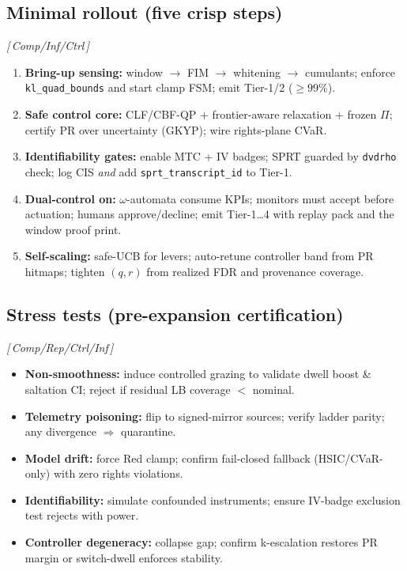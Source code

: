 \documentclass[10pt]{article}
\newcommand{\layertag}[1]{\textsf{\footnotesize[\,#1\,]}}
\begin{document}
\subsection*{Minimal rollout (five crisp steps)}\label{subsec:ops-rollout}
\emph{\layertag{Comp/Inf/Ctrl}}
\begin{enumerate}[leftmargin=*]
\item \textbf{Bring-up sensing:} window $\to$ FIM $\to$ whitening $\to$ cumulants; enforce \texttt{kl\_quad\_bounds} and start clamp FSM; emit Tier-1/2 ($\ge99\%$).
\item \textbf{Safe control core:} CLF/CBF-QP + frontier-aware relaxation + frozen $\Pi$; certify PR over uncertainty (GKYP); wire rights-plane CVaR.
\item \textbf{Identifiability gates:} enable MTC + IV badges; SPRT guarded by \texttt{dvdrho} check; log CIS \emph{and} add \texttt{sprt\_transcript\_id} to Tier-1.
\item \textbf{Dual-control on:} $\omega$-automata consume KPIs; monitors must accept before actuation; humans approve/decline; emit Tier-1…4 with replay pack and the window proof print.
\item \textbf{Self-scaling:} safe-UCB for levers; auto-retune controller band from PR hitmaps; tighten $(q,r)$ from realized FDR and provenance coverage.
\end{enumerate}

\subsection*{Stress tests (pre-expansion certification)}\label{subsec:ops-stress}
\emph{\layertag{Comp/Rep/Ctrl/Inf}}
\begin{itemize}[leftmargin=*]
\item \textbf{Non-smoothness:} induce controlled grazing to validate dwell boost \& saltation CI; reject if residual LB coverage $<$ nominal.
\item \textbf{Telemetry poisoning:} flip to signed-mirror sources; verify ladder parity; any divergence $\Rightarrow$ quarantine.
\item \textbf{Model drift:} force Red clamp; confirm fail-closed fallback (HSIC/CVaR-only) with zero rights violations.
\item \textbf{Identifiability:} simulate confounded instruments; ensure IV-badge exclusion test rejects with power.
\item \textbf{Controller degeneracy:} collapse gap; confirm k-escalation restores PR margin or switch-dwell enforces stability.
\end{itemize}
\end{document}
